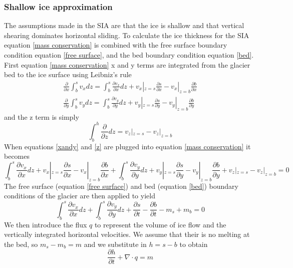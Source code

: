 \documentclass{article}
\begin{document}
\subsubsection{Shallow ice approximation}
The assumptions made in the SIA are that the ice is shallow and that vertical shearing dominates horizontal sliding. To calculate the ice thickness for the SIA equation \ref{mass conservation} is combined with the free surface boundary condition equation \ref{free surface}, and the bed boundary condition equation \ref{bed}\citep{LEMEUR2004, Greve2009}. First equation \ref{mass conservation} x and y terms are integrated from the glacier bed to the ice surface using Leibniz's rule
\begin{subequations} \label{xandy}
\begin{gather}
    \frac{\partial}{\partial x}\int_b^s v_x dz = \int_b^s \frac{\partial v_x}{\partial x}dz+v_x|_{z=s}\frac{\partial s}{\partial x}-v_x|_{z=b}\frac{\partial b}{\partial x} \\
    \frac{\partial}{\partial y}\int_b^s v_y dz = \int_b^s \frac{\partial v_y}{\partial y}dz+v_y|_{z=s}\frac{\partial s}{\partial y}-v_y|_{z=b}\frac{\partial b}{\partial y}
\end{gather}
\end{subequations}
and the z term is simply
\begin{equation}\label{z}
    \int_b^h\frac{\partial}{\partial z}dz = v_z|_{z=s}-v_z|_{z=b}
\end{equation}
When equations \ref{xandy} and \ref{z} are plugged into equation \ref{mass conservation} it becomes
\begin{equation}
    \int_b^s \frac{\partial v_x}{\partial x}dz+v_x|_{z=s}\frac{\partial s}{\partial x}-v_x|_{z=b}\frac{\partial b}{\partial x}+\int_b^s \frac{\partial v_y}{\partial y}dz+v_y|_{z=s}\frac{\partial s}{\partial y}-v_y|_{z=b}\frac{\partial b}{\partial y}+v_z|_{z=s}-v_z|_{z=b} = 0
\end{equation}
The free surface (equation \ref{free surface}) and bed (equation \ref{bed}) boundary conditions of the glacier are then applied to yield
\begin{equation}
    \int_b^s \frac{\partial v_x}{\partial x}dz+\int_b^s \frac{\partial v_y}{\partial y}dz+ \frac{\partial s}{\partial t}-\frac{\partial b}{\partial t} -m_s+m_b = 0
\end{equation}
We then introduce the flux $q$ to represent the volume of ice flow and the vertically integrated horizontal velocities. We assume that their is no melting at the bed, so $m_s-m_b=m$ and we substitute in $h = s-b$ to obtain
\begin{equation}\label{ice thickness}
\frac{\partial h}{\partial t} + \nabla \cdot q = m
\end{equation}
\end{document}

